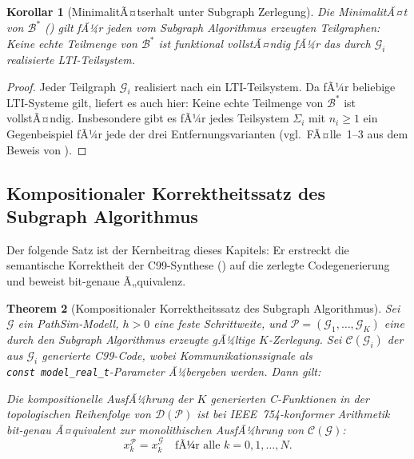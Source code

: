 ﻿\documentclass[12pt,a4paper]{article}
\newtheorem{theorem}{Theorem}[section]
\newtheorem{korollar}[theorem]{Korollar}
\theoremstyle{definition}
\begin{document}
\begin{korollar}[MinimalitÃ¤tserhalt unter Subgraph Zerlegung]
\label{kor:minimal-subgraph}
Die MinimalitÃ¤t von $\mathcal{B}^*$ () gilt fÃ¼r jeden
vom Subgraph Algorithmus erzeugten Teilgraphen: Keine echte Teilmenge von
$\mathcal{B}^*$ ist funktional vollstÃ¤ndig fÃ¼r das durch $\mathcal{G}_i$
realisierte LTI-Teilsystem.
\end{korollar}

\begin{proof}
Jeder Teilgraph $\mathcal{G}_i$ realisiert nach 
ein LTI-Teilsystem. Da  fÃ¼r beliebige LTI-Systeme gilt,
liefert es auch hier: Keine echte Teilmenge von $\mathcal{B}^*$ ist
vollstÃ¤ndig. Insbesondere gibt es fÃ¼r jedes Teilsystem $\Sigma_i$ mit
$n_i \geq 1$ ein Gegenbeispiel fÃ¼r jede der drei Entfernungsvarianten
(vgl.\ FÃ¤lle~1--3 aus dem Beweis von ).
\end{proof}

\subsection{Kompositionaler Korrektheitssatz des Subgraph Algorithmus}
\label{subsec:subgraph-correct}

Der folgende Satz ist der Kernbeitrag dieses Kapitels: Er erstreckt die
semantische Korrektheit der C99-Synthese () auf die
zerlegte Codegenerierung und beweist bit-genaue Ã„quivalenz.

\begin{theorem}[Kompositionaler Korrektheitssatz des Subgraph Algorithmus]
\label{thm:comp-correct}
Sei $\mathcal{G}$ ein PathSim-Modell, $h > 0$ eine feste Schrittweite,
und $\mathcal{P} = (\mathcal{G}_1, \ldots, \mathcal{G}_K)$ eine durch den
Subgraph Algorithmus erzeugte gÃ¼ltige $K$-Zerlegung. Sei
$\mathcal{C}(\mathcal{G}_i)$ der aus $\mathcal{G}_i$ generierte C99-Code,
wobei Kommunikationssignale als \texttt{const~model\_real\_t}-Parameter
Ã¼bergeben werden. Dann gilt:

Die kompositionelle AusfÃ¼hrung der $K$ generierten C-Funktionen in der
topologischen Reihenfolge von $\mathcal{D}(\mathcal{P})$ ist bei
IEEE~754-konformer Arithmetik \emph{bit-genau Ã¤quivalent} zur monolithischen
AusfÃ¼hrung von $\mathcal{C}(\mathcal{G})$:
\[
  x_k^{\mathcal{P}} = x_k^{\mathcal{G}} \quad \text{fÃ¼r alle } k = 0, 1, \ldots, N.
\]
\end{theorem}
\end{document}
